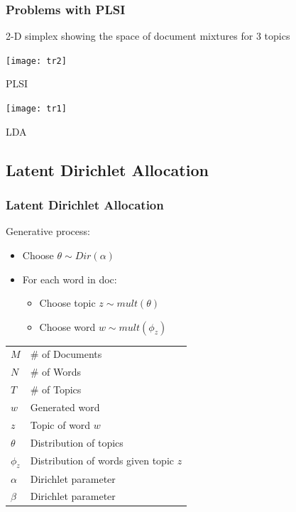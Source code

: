 \documentclass[10pt, svgnames]{beamer}
\begin{document}
\begin{frame}
\frametitle{Problems with PLSI}
\begin{center}
2-D simplex showing the space of document mixtures for 3 topics
\end{center}
\begin{minipage}{0.49\linewidth}
\begin{center}
\texttt{[image: tr2]}
\end{center}
\begin{center}
PLSI
\end{center}
\end{minipage}
\begin{minipage}{0.49\linewidth}
\begin{center}
\texttt{[image: tr1]}
\end{center}
\begin{center}
LDA
\end{center}
\end{minipage}
\end{frame}

\subsection{Latent Dirichlet Allocation}

\begin{frame}
\frametitle{Latent Dirichlet Allocation \cite{blei:jmlr03}}
\begin{minipage}{0.5\linewidth}
\begin{center}

\end{center}
\end{minipage}
\begin{minipage}{0.45\linewidth}
Generative process:
\begin{itemize}
\item \footnotesize{Choose $\theta \sim Dir(\alpha)$}
\item \footnotesize{For each word in doc:}
\begin{itemize}
\item \footnotesize{Choose topic $z \sim mult(\theta)$}
\item \footnotesize{Choose word $w \sim mult(\phi_z)$}
\end{itemize}
\end{itemize}
\vspace{12pt}
		\scriptsize{
		\begin{tabular}{ll}
			$M$ & \# of Documents \\
			$N$ & \# of Words \\
			$T$ & \# of Topics \\
			$w$ & Generated word   \\ 
			$z$ & Topic of word $w$  \\
			$\theta$ & Distribution of topics \\
			$\phi_z$   & Distribution of words given topic $z$ \\
			$\alpha$   & Dirichlet parameter \\
			$\beta$    & Dirichlet parameter
		\end{tabular}
		}
\end{minipage}
\end{frame}
\end{document}
